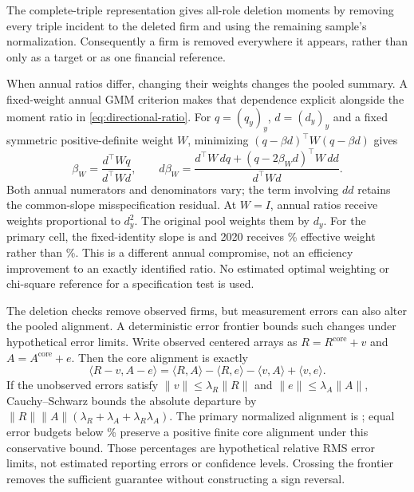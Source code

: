 The complete-triple representation gives all-role deletion moments by
removing every triple incident to the deleted firm and using the remaining
sample's normalization.
Consequently a firm is removed everywhere it appears, rather than only as a
target or as one financial reference.

When annual ratios differ, changing their weights changes the pooled
summary.
A fixed-weight annual GMM criterion makes that dependence explicit alongside
the moment ratio in \eqref{eq:directional-ratio}.
For $q=(q_y)_y$, $d=(d_y)_y$ and a fixed symmetric positive-definite weight
$W$, minimizing $(q-\beta d)^\top W(q-\beta d)$ gives
\begin{equation}\label{eq:annual-gmm}
  \beta_W=\frac{d^\top Wq}{d^\top Wd},\qquad
  d\beta_W=\frac{d^\top W\,dq+(q-2\beta_W d)^\top W\,dd}{d^\top Wd}.
\end{equation}
Both annual numerators and denominators vary; the term involving $dd$
retains the common-slope misspecification residual.
At $W=I$, annual ratios receive weights proportional to $d_y^2$.
The original pool weights them by $d_y$.
For the primary cell, the fixed-identity slope is  and
2020 receives \% effective weight rather
than \%.
This is a different annual compromise, not an efficiency improvement to an
exactly identified ratio.
No estimated optimal weighting or chi-square reference for a
specification test is used.

The deletion checks remove observed firms, but measurement errors can also
alter the pooled alignment.
A deterministic error frontier bounds such changes under hypothetical
error limits.
Write observed centered arrays as $R=R^{\mathrm{core}}+v$ and
$A=A^{\mathrm{core}}+e$.
Then the core alignment is exactly
\begin{equation}\label{eq:error-frontier}
  \langle R-v,A-e\rangle
  =\langle R,A\rangle-\langle R,e\rangle-\langle v,A\rangle+\langle v,e\rangle.
\end{equation}
If the unobserved errors satisfy $\|v\|\leq\lambda_R\|R\|$ and
$\|e\|\leq\lambda_A\|A\|$, Cauchy--Schwarz bounds the absolute departure by
$\|R\|\|A\|(\lambda_R+\lambda_A+\lambda_R\lambda_A)$.
The primary normalized alignment is ; equal
error budgets below \% preserve a positive
finite core alignment under this conservative bound.
Those percentages are hypothetical relative RMS error limits, not estimated
reporting errors or confidence levels.
Crossing the frontier removes the sufficient guarantee without constructing a
sign reversal.

